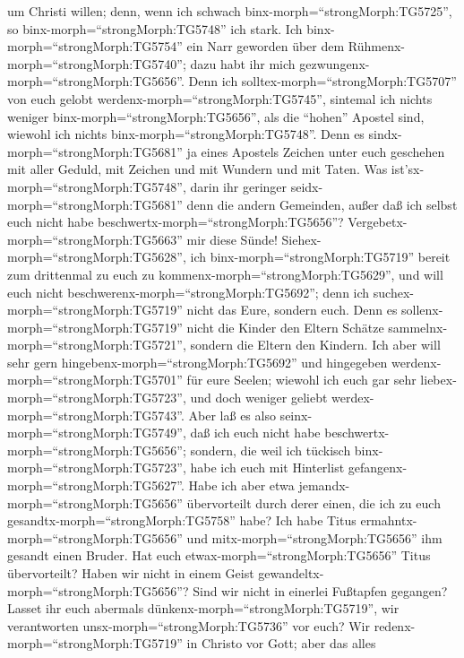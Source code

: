 um Christi willen; denn, wenn ich schwach
binx-morph=``strongMorph:TG5725'', so binx-morph=``strongMorph:TG5748''
ich stark.  Ich binx-morph=``strongMorph:TG5754'' ein Narr
geworden über dem Rühmenx-morph=``strongMorph:TG5740''; dazu habt ihr
mich gezwungenx-morph=``strongMorph:TG5656''. Denn ich
solltex-morph=``strongMorph:TG5707'' von euch gelobt
werdenx-morph=``strongMorph:TG5745'', sintemal ich nichts weniger
binx-morph=``strongMorph:TG5656'', als die ``hohen'' Apostel sind,
wiewohl ich nichts binx-morph=``strongMorph:TG5748''.  Denn
es sindx-morph=``strongMorph:TG5681'' ja eines Apostels Zeichen unter
euch geschehen mit aller Geduld, mit Zeichen und mit Wundern und mit
Taten.  Was ist'sx-morph=``strongMorph:TG5748'', darin ihr
geringer seidx-morph=``strongMorph:TG5681'' denn die andern Gemeinden,
außer daß ich selbst euch nicht habe
beschwertx-morph=``strongMorph:TG5656''?
Vergebetx-morph=``strongMorph:TG5663'' mir diese Sünde! 
Siehex-morph=``strongMorph:TG5628'', ich
binx-morph=``strongMorph:TG5719'' bereit zum drittenmal zu euch zu
kommenx-morph=``strongMorph:TG5629'', und will euch nicht
beschwerenx-morph=``strongMorph:TG5692''; denn ich
suchex-morph=``strongMorph:TG5719'' nicht das Eure, sondern euch. Denn
es sollenx-morph=``strongMorph:TG5719'' nicht die Kinder den Eltern
Schätze sammelnx-morph=``strongMorph:TG5721'', sondern die Eltern den
Kindern.  Ich aber will sehr gern
hingebenx-morph=``strongMorph:TG5692'' und hingegeben
werdenx-morph=``strongMorph:TG5701'' für eure Seelen; wiewohl ich euch
gar sehr liebex-morph=``strongMorph:TG5723'', und doch weniger geliebt
werdex-morph=``strongMorph:TG5743''.  Aber laß es also
seinx-morph=``strongMorph:TG5749'', daß ich euch nicht habe
beschwertx-morph=``strongMorph:TG5656''; sondern, die weil ich tückisch
binx-morph=``strongMorph:TG5723'', habe ich euch mit Hinterlist
gefangenx-morph=``strongMorph:TG5627''.  Habe ich aber etwa
jemandx-morph=``strongMorph:TG5656'' übervorteilt durch derer einen, die
ich zu euch gesandtx-morph=``strongMorph:TG5758'' habe? 
Ich habe Titus ermahntx-morph=``strongMorph:TG5656'' und
mitx-morph=``strongMorph:TG5656'' ihm gesandt einen Bruder. Hat euch
etwax-morph=``strongMorph:TG5656'' Titus übervorteilt? Haben wir nicht
in einem Geist gewandeltx-morph=``strongMorph:TG5656''? Sind wir nicht
in einerlei Fußtapfen gegangen?  Lasset ihr euch abermals
dünkenx-morph=``strongMorph:TG5719'', wir verantworten
unsx-morph=``strongMorph:TG5736'' vor euch? Wir
redenx-morph=``strongMorph:TG5719'' in Christo vor Gott; aber das alles
